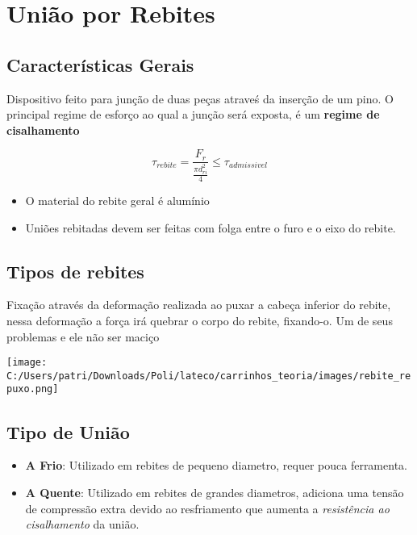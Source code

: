 \section{União por Rebites}

\subsection{Características Gerais}

Dispositivo feito para junção de duas peças atraveś da inserção de um pino. O principal regime de esforço ao qual a junção será exposta, é um \textbf{regime de cisalhamento}

\begin{namedtheorem}
  \[ \tau_{rebite} = \frac{F_r}{\frac{\pi d_{ri}^2}{4}} \leq \tau_{admissivel} \]
\end{namedtheorem}

\begin{itemize}
	\item O material do rebite geral é alumínio
	\item Uniões rebitadas devem ser feitas com folga entre o furo e o eixo do rebite.
\end{itemize}

\subsection{Tipos de rebites}

\begin{namedtheorem}
  Fixação através da deformação realizada ao puxar a cabeça inferior do rebite, nessa deformação a força irá quebrar o corpo do rebite, fixando-o. Um de seus problemas e ele não ser maciço

\begin{center}
	\texttt{[image: C:/Users/patri/Downloads/Poli/lateco/carrinhos\_teoria/images/rebite\_repuxo.png]}  
\end{center}

\end{namedtheorem}

\subsection{Tipo de União}

\begin{itemize}
	\item \textbf{A Frio}: Utilizado em rebites de pequeno diametro, requer pouca ferramenta.
	\item \textbf{A Quente}: Utilizado em rebites de grandes diametros, adiciona uma tensão de compressão extra devido ao resfriamento que aumenta a \textit{resistência ao cisalhamento} da união.
\end{itemize}

